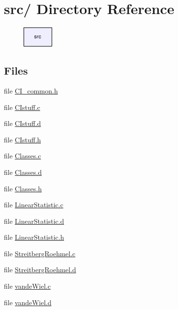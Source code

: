 \hypertarget{dir_000000}{
\section{src/ Directory Reference}
\label{dir_000000}
}


\begin{figure}[H]
\begin{center}
\leavevmode
\includegraphics[width=45pt]{dir_000000_dep}
\end{center}
\end{figure}
\subsection*{Files}
\begin{CompactItemize}
\item 
file \hyperlink{CI__common_8h}{CI\_\-common.h}
\item 
file \hyperlink{CIstuff_8c}{CIstuff.c}
\item 
file \hyperlink{CIstuff_8d}{CIstuff.d}
\item 
file \hyperlink{CIstuff_8h}{CIstuff.h}
\item 
file \hyperlink{Classes_8c}{Classes.c}
\item 
file \hyperlink{Classes_8d}{Classes.d}
\item 
file \hyperlink{Classes_8h}{Classes.h}
\item 
file \hyperlink{LinearStatistic_8c}{Linear\-Statistic.c}
\item 
file \hyperlink{LinearStatistic_8d}{Linear\-Statistic.d}
\item 
file \hyperlink{LinearStatistic_8h}{Linear\-Statistic.h}
\item 
file \hyperlink{StreitbergRoehmel_8c}{Streitberg\-Roehmel.c}
\item 
file \hyperlink{StreitbergRoehmel_8d}{Streitberg\-Roehmel.d}
\item 
file \hyperlink{vandeWiel_8c}{vande\-Wiel.c}
\item 
file \hyperlink{vandeWiel_8d}{vande\-Wiel.d}
\end{CompactItemize}
